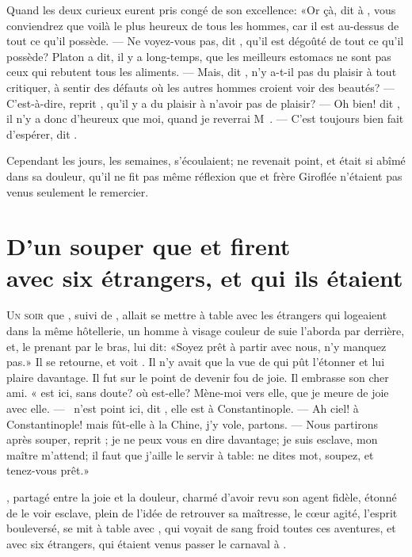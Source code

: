 Quand les deux curieux eurent pris congé de son excellence: «Or çà, dit
 à , vous conviendrez que voilà le plus heureux de tous
les hommes, car il est au-dessus de tout ce qu’il possède. — Ne
voyez-vous pas, dit , qu’il est dégoûté de tout ce qu’il possède?
Platon a dit, il y a long-temps, que les meilleurs estomacs ne sont pas
ceux qui rebutent tous les aliments. — Mais, dit , n’y a-t-il pas
du plaisir à tout critiquer, à sentir des défauts où les autres hommes
croient voir des 
beautés? — C’est-à-dire, reprit , qu’il y a du
plaisir à n’avoir pas de plaisir? — Oh bien! dit , il n’y a donc
d’heureux que moi, quand je reverrai M~. — C’est
toujours bien fait d’espérer, dit .

Cependant les jours, les semaines, s’écoulaient;  ne revenait
point, et  était si abîmé dans sa douleur, qu’il ne fit pas même
réflexion que  et frère Giroflée n’étaient pas venus seulement
le remercier.


\chapter[D’un souper que Candide et Martin firent…]{D’un souper que  et  firent\\avec six étrangers, et qui ils
étaient}


\lettrine{U}{n soir} que , suivi de , allait se mettre à table avec les
étrangers qui logeaient dans la même hôtellerie, un homme à visage
couleur de suie l’aborda par derrière, et, le prenant par le bras, lui
dit: «Soyez prêt à partir avec nous, n’y manquez pas.» Il se retourne, et
voit . Il n’y avait que la vue de  qui pût l’étonner et
lui plaire davantage. Il fut sur le point de devenir fou de joie. Il
embrasse son cher ami. « est ici, sans doute? où est-elle?
Mène-moi vers elle, que je meure de joie avec elle. —  n’est
point ici, dit , elle est à Constantinople. — Ah ciel! à
Constantinople! mais fût-elle à la Chine, j’y vole, partons. — Nous
partirons après souper, reprit ; je ne peux vous en dire
davantage; je suis esclave, mon maître m’attend; il faut que j’aille le
servir à table: ne dites mot, soupez, et tenez-vous prêt.»

, partagé entre la joie et la douleur, charmé d’avoir revu son
agent fidèle, étonné de le voir esclave, plein de l’idée de retrouver
sa maîtresse, le cœur agité, l’esprit bouleversé, se mit à table avec
, qui voyait de sang froid toutes ces aventures, et avec six
étrangers, qui étaient venus passer le carnaval à  .


